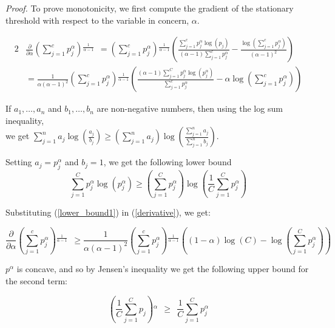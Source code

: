 \documentclass[runningheads]{llncs}
\begin{document}
\textit{Proof.} To prove monotonicity, we first compute the gradient of the stationary
threshold with respect to the variable in concern, $\alpha$.

\begin{alignat}{2} & \frac{\partial }{\partial \alpha} \left(\sum _{j=1}^c
p_j^{\alpha}\right){}^{\frac{1}{\alpha -1}}\ \ = \left(\sum _{j=1}^c
p_j^{\alpha}\right){}^{\frac{1}{\alpha -1}} \left(\frac{\sum _{j=1}^c p_j^{\alpha } \log
\left(p_j\right)}{(\alpha -1) \sum _{j=1}^c p_j^{\alpha}}-\frac{\log \left(\sum _{j=1}^c
p_j^{\alpha}\right)}{(\alpha -1)^2}\right) \\
& = \frac{1}{\alpha  (\alpha -1)^2} \left(\sum _{j=1}^c p_j^{\alpha
}\right){}^{\frac{1}{\alpha -1}} \left(\frac{(\alpha -1) \sum _{j=1}^C p_j^{\alpha }
\log \left(p_j^{\alpha}\right)}{\sum _{j=1}^c p_j^{\alpha }}-\alpha \log \left(\sum
_{j=1}^c p_j^{\alpha }\right)\right) \label{derivative} \end{alignat}

If $a_1,\dots ,a_n$ and $b_1,\dots ,b_n$ are non-negative numbers, then using the log
sum inequality, \\ we get $\sum _{j=1}^n a_j \log \left(\frac{a_j}{b_j}\right)\geq
\left(\sum _{j=1}^n a_j\right) \log \left(\frac{\sum _{j=1}^n a_j}{\sum _{j=1}^n
b_j}\right)$.

Setting $a_j=p_j^\alpha$ and $b_j=1$, we get the following lower bound
\begin{equation} \sum _{j=1}^C p_j^{\alpha } \log
\left(p_j^{\alpha }\right)\geq \left(\sum _{j=1}^C
p_j^{\alpha}\right) \log \left(\frac{1}{C} \sum _{j=1}^C
p_j^{\alpha}\right) \label{lower_bound1} \end{equation}

Substituting (\ref{lower_bound1}) in (\ref{derivative}), we get:

\begin{equation} \frac{\partial }{\partial \alpha} \left(\sum
_{j=1}^c p_j^{\alpha}\right){}^{\frac{1}{\alpha -1}}\ \ \geq
\frac{1}{\alpha  (\alpha -1)^2} \left(\sum _{j=1}^c
p_j^{\alpha}\right){}^{\frac{1}{\alpha -1}} \left((1-\alpha )
\log (C)-\log \left(\sum _{j=1}^C p_j^{\alpha }\right)\right)
\label{lb_subs} \end{equation}

$p^{\alpha}$ is concave, and so by Jensen's inequality we get the following upper bound
for the second term:

\begin{equation} \left(\frac{1}{C}{\sum _{j=1}^C
p_j}{}\right){}^{\alpha }\ \ \geq\ \ \frac{1}{C}{\sum _{j=1}^C
p_j^{\alpha }}{} \end{equation}
\end{document}
